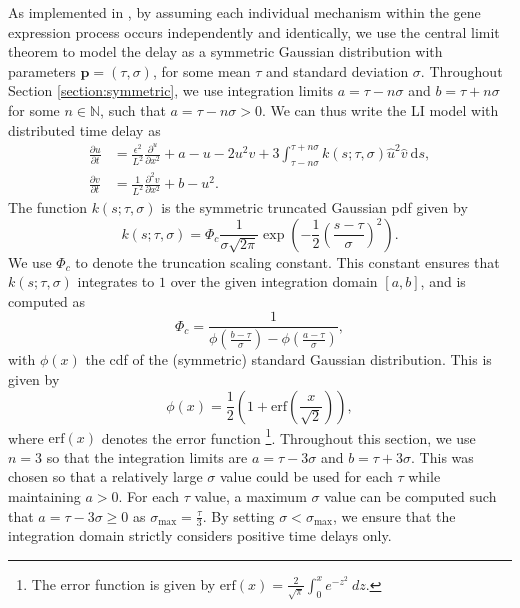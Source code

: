 As implemented in \cite{william}, by assuming each individual mechanism within the gene expression process occurs independently and identically, we use the central limit theorem to model the delay as a symmetric Gaussian distribution with parameters $\textbf{p}=(\tau,\sigma)$, for some mean $\tau$ and standard deviation $\sigma$. Throughout Section \ref{section:symmetric}, we use integration limits $a=\tau-n\sigma$ and $b=\tau+n\sigma$ for some $n\in\mathbb{N}$, such that $a=\tau-n\sigma>0$. We can thus write the LI model with distributed time delay as
\begin{equation}\label{symmod}
    \begin{split}
        \frac{\partial u}{\partial t}&=\frac{\epsilon^2}{L^2}\frac{\partial^u}{\partial x^2}+a-u-2u^2v+3\int_{\tau-n\sigma}^{\tau+n\sigma}k(s;\tau,\sigma)\hat{u}^2\hat{v}\ \text{d}s,\\
        \frac{\partial v}{\partial t}&=\frac{1}{L^2}\frac{\partial^2v}{\partial x^2}+b-u^2.
    \end{split}
\end{equation}
The function $k(s;\tau,\sigma)$ is the symmetric truncated Gaussian pdf given by
\begin{equation}
k(s;\tau,\sigma)=\Phi_c\frac{1}{\sigma\sqrt{2\pi}}\exp\left(-\frac{1}{2}\left(\frac{s-\tau}{\sigma}\right)^2\right).
\end{equation}
We use $\Phi_c$ to denote the truncation scaling constant. This constant ensures that $k(s;\tau,\sigma)$ integrates to $1$ over the given integration domain $[a,b]$, and is computed as
\begin{equation}
    \Phi_c=\frac{1}{\phi\left(\frac{b-\tau}{\sigma}\right)-\phi\left(\frac{a-\tau}{\sigma}\right)},
\end{equation}
with $\phi(x)$ the cdf of the (symmetric) standard Gaussian distribution. This is given by
\begin{equation}\label{phi}
    \phi(x)=\frac{1}{2}\left(1+\text{erf}\left(\frac{x}{\sqrt{2}}\right)\right),
\end{equation}
where $\text{erf}(x)$ denotes the error function \footnote{The error function is given by $\text{erf}(x)=\frac{2}{\sqrt{\pi}}\int_0^xe^{-z^2}\ dz$.}. Throughout this section, we use $n=3$ so that the integration limits are $a=\tau-3\sigma$ and $b=\tau+3\sigma$. This was chosen so that a relatively large $\sigma$ value could be used for each $\tau$ while maintaining $a>0$. For each $\tau$ value, a maximum $\sigma$ value can be computed such that $a=\tau-3\sigma\geq0$ as $\sigma_{\max}=\frac{\tau}{3}$. By setting $\sigma<\sigma_{\max}$, we ensure that the integration domain strictly considers positive time delays only.

